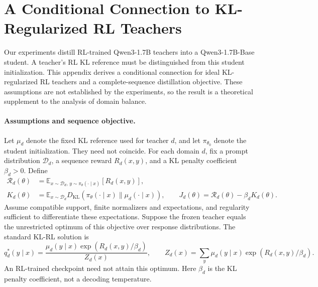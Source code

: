 \section{A Conditional Connection to KL-Regularized RL Teachers}
\label{app:rl_teacher_connection}

Our experiments distill RL-trained Qwen3-1.7B teachers into a
Qwen3-1.7B-Base student. A teacher's RL KL reference must be distinguished
from this student initialization. This appendix derives a conditional
connection for ideal KL-regularized RL teachers and a complete-sequence
distillation objective. These assumptions are not established by the
experiments, so the result is a theoretical supplement to the analysis
of domain balance.

\paragraph{Assumptions and sequence objective.}
Let $\mu_d$ denote the fixed KL reference used for teacher $d$, and
let $\pi_{\theta_0}$ denote the student initialization. They need not coincide.
For each domain $d$, fix a prompt distribution $\mathcal D_d$, a
sequence reward $R_d(x,y)$, and a KL penalty coefficient $\beta_d>0$.
Define
\begin{equation}
\begin{aligned}
\mathcal R_d(\theta)
&=\mathbb E_{x\sim\mathcal D_d,\,y\sim\pi_\theta(\cdot\mid x)}
  [R_d(x,y)],\\
K_d(\theta)
&=\mathbb E_{x\sim\mathcal D_d}
  D_{\mathrm{KL}}\!\left(\pi_\theta(\cdot\mid x)
  \|\mu_d(\cdot\mid x)\right),
\qquad J_d(\theta)=\mathcal R_d(\theta)-\beta_d K_d(\theta).
\end{aligned}
\label{eq:rl_teacher_objective}
\end{equation}
Assume compatible support, finite normalizers and expectations, and
regularity sufficient to differentiate these expectations.
Suppose the frozen teacher equals the unrestricted optimum of this
objective over response distributions. The standard KL-RL solution
\citep[Appendix A.1]{rafailov2023dpo} is
\begin{equation}
q_d^*(y\mid x)
=\frac{\mu_d(y\mid x)\exp(R_d(x,y)/\beta_d)}{Z_d(x)},
\qquad
Z_d(x)=\sum_y\mu_d(y\mid x)\exp(R_d(x,y)/\beta_d).
\label{eq:rl_teacher_optimum}
\end{equation}
An RL-trained checkpoint need not attain this optimum. Here $\beta_d$
is the KL penalty coefficient, not a decoding temperature.

